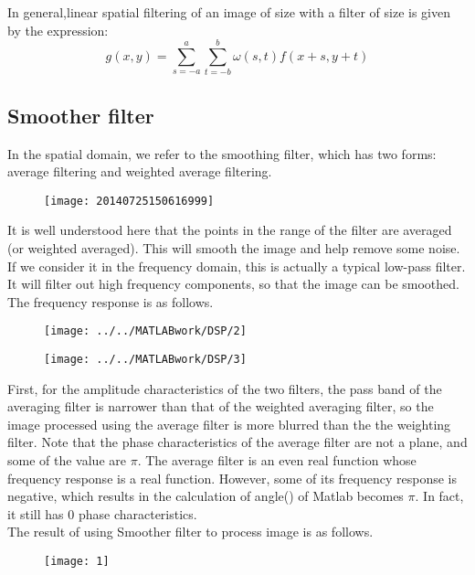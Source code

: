 \documentclass[12pt,a4paper]{article}
\begin{document}
In general,linear spatial filtering of an image of size with a filter of size is given by the expression:
$$g(x, y)=\sum_{s=-a}^a \sum_{t=-b}^b \omega(s,t)f(x+s, y+t)$$
\subsection{Smoother filter}
In the spatial domain, we refer to the smoothing filter, which has two forms: average filtering and weighted average filtering.\\
\begin{figure}[h]
	\begin{center}
		\texttt{[image: 20140725150616999]}
	\end{center}
\end{figure}
\newpage
It is well understood here that the points in  the range of the filter are averaged (or weighted averaged). This will smooth the image and help remove some noise. If we consider it in the frequency domain, this is actually a typical low-pass filter. It will filter out high frequency components, so that the image can be smoothed. The frequency response is as follows.

\begin{figure}[h]
	\begin{center}
		\texttt{[image: ../../MATLABwork/DSP/2]}
	\end{center}
\end{figure}
\begin{figure}[ht]
	\begin{center}
		\texttt{[image: ../../MATLABwork/DSP/3]}
	\end{center}
\end{figure}
First, for the amplitude characteristics of the two filters, the pass band of the averaging filter is narrower than that of the weighted averaging filter, so the image processed using the average filter is more blurred than the the weighting filter. Note that the phase characteristics of the average filter are not a plane, and some of the value are $\pi$. The average filter is an even real function whose frequency response is a real function. However, some of its frequency response is negative, which results in the calculation of angle() of Matlab becomes $\pi$. In fact, it still has 0 phase characteristics.\\

The result of using Smoother filter to process image is as follows.

\begin{figure}[ht]
	\begin{center}
		\texttt{[image: 1]}
	\end{center}
\end{figure}
\end{document}
